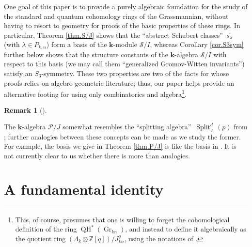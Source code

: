 \documentclass[numbers=enddot,12pt,final,onecolumn,notitlepage]{scrartcl}%
\theoremstyle{definition}
\newtheorem{remk}[theo]{Remark}
\newenvironment{remark}[1][]
{\begin{remk}[#1]\begin{leftbar}}
{\end{leftbar}\end{remk}}
\begin{document}
One goal of this paper is to provide a purely algebraic foundation for the
study of the standard and quantum cohomology rings of the Grassmannian,
without having to resort to geometry for proofs of the basic properties of
these rings. In particular, Theorem \ref{thm.S/J} shows that the
\textquotedblleft abstract Schubert classes\textquotedblright\ $\overline
{s_{\lambda}}$ (with $\lambda\in P_{k,n}$) form a basis of the $\mathbf{k}%
$-module $\mathcal{S}/I$, whereas Corollary \ref{cor.S3sym} further below
shows that the structure constants of the $\mathbf{k}$-algebra $\mathcal{S}/I$
with respect to this basis (we may call them \textquotedblleft generalized
Gromov-Witten invariants\textquotedblright) satisfy an $S_{3}$-symmetry. These
two properties are two of the facts for whose proofs \cite{Postni05} relies on
algebro-geometric literature; thus, our paper helps provide an alternative
footing for \cite{Postni05} using only combinatorics and
algebra\footnote{This, of course, presumes that one is willing to forget the
cohomological definition of the ring $\operatorname*{QH}\nolimits^{\ast
}\left(  \operatorname*{Gr}\nolimits_{kn}\right)  $, and instead to define it
algebraically as the quotient ring $\left(  \Lambda_{k}\otimes\mathbb{Z}%
\left[  q\right]  \right)  /J_{kn}^{q}$, using the notations of
\cite{Postni05}.}.

\begin{remark}
The $\mathbf{k}$-algebra $\mathcal{P}/J$ somewhat resembles the
\textquotedblleft splitting algebra\textquotedblright\ $\operatorname*{Split}%
\nolimits_{A}^{d}\left(  p\right)  $ from \cite[\S 1.3]{LakTho12}; further
analogies between these concepts can be made as we study the former. For
example, the basis we give in Theorem \ref{thm.P/J} is like the basis in
\cite[(1.5)]{LakTho12}. It is not currently clear to us whether there is more
than analogies.
\end{remark}

\section{A fundamental identity}
\end{document}
